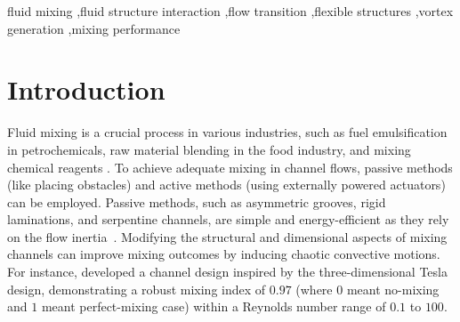 \documentclass[reprint,a4paper,fleqn]{cas-dc} %
\begin{document}
	
	
	
	\begin{keywords}
		fluid mixing \sep fluid structure interaction \sep flow transition \sep flexible structures \sep vortex generation \sep mixing performance
	\end{keywords}
	
	\maketitle
	
	\section{Introduction}
	\label{sec:headings}
	
	
	Fluid mixing is a crucial process in various industries, such as fuel emulsification in petrochemicals, raw material blending in the food industry, and mixing chemical reagents \citep{Yeh2015, Nunez-Flores2020, Peterwitz2021,Wang2021}. To achieve adequate mixing in channel flows, passive methods (like placing obstacles) and active methods (using externally powered actuators) can be employed. Passive methods, such as asymmetric grooves, rigid laminations, and serpentine channels, are simple and energy-efficient as they rely on the flow inertia~\citep{Nguyen2005, Yang_2008, Afzal_2014, Kashid2011, Kang2015,Derksen2010}. Modifying the structural and dimensional aspects of mixing channels can improve mixing outcomes by inducing chaotic convective motions. For instance, \cite{Yang2015} developed a channel design inspired by the three-dimensional Tesla design, demonstrating a robust mixing index of $0.97$ (where $0$ meant no-mixing and $1$ meant perfect-mixing case) within a Reynolds number range of $0.1$ to $100$.
\end{document}
